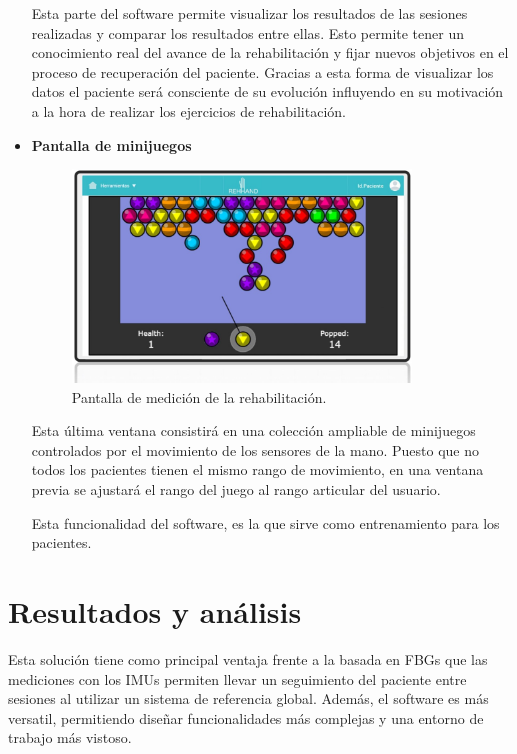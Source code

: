 \begin{itemize}
	Esta parte del software permite visualizar los resultados de las sesiones realizadas y comparar los resultados entre ellas. Esto permite tener un conocimiento real del avance de la rehabilitación y fijar nuevos objetivos en el proceso de recuperación del paciente. Gracias a esta forma de visualizar los datos el paciente será consciente de su evolución influyendo en su motivación a la hora de realizar los ejercicios de rehabilitación.
 
	
	\clearpage
	
	\item \textbf{Pantalla de minijuegos}
	
	\begin{figure}[H]
		\centering
		\includegraphics[width=0.85\textwidth]{./img/softwareIMU3}
		\caption{Pantalla de medición de la rehabilitación. } 
		\label{fig:softIMU3}
	\end{figure} 
	
	Esta última ventana consistirá en una colección ampliable de minijuegos controlados por el movimiento de los sensores de la mano. Puesto que no todos los pacientes tienen el mismo rango de movimiento, en una ventana previa se ajustará el rango del juego al rango articular del usuario.
	
	Esta funcionalidad del software, es la que sirve como entrenamiento para los pacientes. 
	
	
\end{itemize}




\section{Resultados y análisis}
\label{sec:resultados4}

   
	
	Esta solución tiene como principal ventaja frente a la basada en FBGs que las mediciones con los IMUs permiten llevar un seguimiento del paciente entre sesiones al utilizar un sistema de referencia global. Además, el software es más versatil, permitiendo diseñar funcionalidades más complejas y una entorno de trabajo más vistoso.
 
